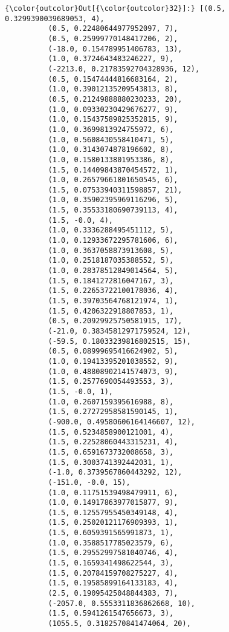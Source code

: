 \documentclass[11pt]{article}
\begin{document}
\begin{Verbatim}[commandchars=\\\{\}]
{\color{outcolor}Out[{\color{outcolor}32}]:} [(0.5, 0.3299390039689053, 4),
          (0.5, 0.22480644977952097, 7),
          (0.5, 0.25999770148417206, 2),
          (-18.0, 0.154789951406783, 13),
          (1.0, 0.3724643483246227, 9),
          (-2213.0, 0.21783592704328936, 12),
          (0.5, 0.15474444816683164, 2),
          (1.0, 0.39012135209543813, 8),
          (0.5, 0.21249888880230233, 20),
          (1.0, 0.09330230429676277, 9),
          (1.0, 0.15437589825352815, 9),
          (1.0, 0.3699813924755972, 6),
          (1.0, 0.5608430558410471, 5),
          (1.0, 0.3143074878196602, 8),
          (1.0, 0.1580133801953386, 8),
          (1.5, 0.14409843870454572, 1),
          (1.0, 0.26579661801650545, 6),
          (1.5, 0.07533940311598857, 21),
          (1.0, 0.35902395969116296, 5),
          (1.5, 0.35533180690739113, 4),
          (1.5, -0.0, 4),
          (1.0, 0.3336288495451112, 5),
          (1.0, 0.12933672295781606, 6),
          (1.0, 0.3637058873913608, 5),
          (1.0, 0.2518187035388552, 5),
          (1.0, 0.28378512849014564, 5),
          (1.5, 0.1841272816047167, 3),
          (1.5, 0.22653722100178036, 4),
          (1.5, 0.39703564768121974, 1),
          (1.5, 0.4206322918807853, 1),
          (0.5, 0.20929925750581915, 17),
          (-21.0, 0.38345812971759524, 12),
          (-59.5, 0.18033239816802515, 15),
          (0.5, 0.08999695416624902, 5),
          (1.0, 0.19413395201038552, 9),
          (1.0, 0.48808902141574073, 9),
          (1.5, 0.2577690054493553, 3),
          (1.5, -0.0, 1),
          (1.0, 0.2607159395616988, 8),
          (1.5, 0.27272958581590145, 1),
          (-900.0, 0.49580606164146607, 12),
          (1.5, 0.5234858900121001, 4),
          (1.5, 0.22528060443315231, 4),
          (1.5, 0.6591673732008658, 3),
          (1.5, 0.3003741392442031, 1),
          (-1.0, 0.3739567860443292, 12),
          (-151.0, -0.0, 15),
          (1.0, 0.11751539498479911, 6),
          (1.0, 0.14917863977015877, 9),
          (1.5, 0.12557955450349148, 4),
          (1.5, 0.25020121176909393, 1),
          (1.5, 0.6059391565991873, 1),
          (1.0, 0.3588517785023579, 6),
          (1.5, 0.29552997581040746, 4),
          (1.5, 0.1659341498622544, 3),
          (1.5, 0.20784159708275227, 4),
          (1.5, 0.19585899164133183, 4),
          (2.5, 0.19095425048844383, 7),
          (-2057.0, 0.5553311836862668, 10),
          (1.5, 0.5941261547656673, 3),
          (1055.5, 0.3182570841474064, 20),

\end{Verbatim}
\end{document}
